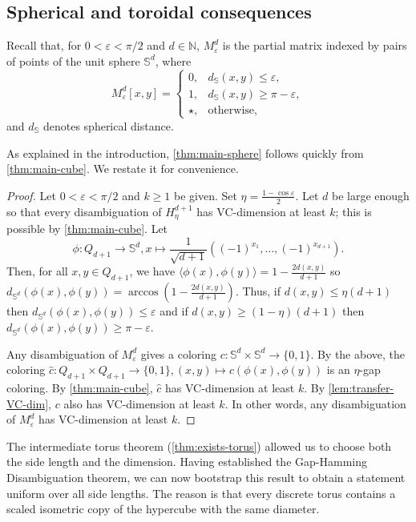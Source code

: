\documentclass[11pt]{article}
\theoremstyle{remark}
\begin{document}
\subsection{Spherical and toroidal consequences}

Recall that, for $0<\varepsilon<\pi/2$ and $d \in \mathbb{N}$, $M_\varepsilon^d$ is the partial matrix indexed by pairs of points of the unit sphere $\mathbb S^d$, where
\[
M_\varepsilon^d[x,y]=
\begin{cases}
0, & d_{\mathbb S}(x,y)\leq\varepsilon,\\
1, & d_{\mathbb S}(x,y)\geq\pi-\varepsilon,\\
\star, & \text{otherwise},
\end{cases}
\]
and $d_{\mathbb S}$ denotes spherical distance.

As explained in the introduction, \cref{thm:main-sphere} follows quickly from \cref{thm:main-cube}. We restate it for convenience.

\mainsphere*

\begin{proof}
    Let $0 < \varepsilon < \pi/2$ and $k \geq 1$ be given.
    Set $\eta = \frac{1-\cos\varepsilon}{2}$.
    Let $d$ be large enough so that every disambiguation of $H_{\eta}^{d+1}$ has VC-dimension at least $k$; this is possible by \cref{thm:main-cube}.
    Let \[\phi : Q_{d+1} \to \mathbb{S}^{d}, x \mapsto \frac{1}{\sqrt{d+1}}\left((-1)^{x_1}, \ldots, (-1)^{x_{d+1}}\right).\]
    Then, for all $x, y \in Q_{d+1}$, we have $\langle \phi(x), \phi(y)\rangle = 1-\frac{2d(x, y)}{d+1}$ so $d_{\mathbb{S}^{d}}(\phi(x), \phi(y)) = \arccos\left(1-\frac{2d(x, y)}{d+1}\right)$.
    Thus, if $d(x, y) \leq \eta (d+1)$ then $d_{\mathbb{S}^{d}}(\phi(x), \phi(y)) \leq \varepsilon$ and if $d(x, y) \geq (1-\eta) (d+1)$ then $d_{\mathbb{S}^{d}}(\phi(x), \phi(y)) \geq \pi - \varepsilon$.
    
    Any disambiguation of $M_{\varepsilon}^d$ gives a coloring $c : \mathbb{S}^{d} \times \mathbb{S}^{d} \to \{0, 1\}$.
    By the above, the coloring $\widehat{c} : Q_{d+1} \times Q_{d+1} \to \{0, 1\}, (x, y) \mapsto c(\phi(x), \phi(y))$ is an $\eta$-gap coloring.
    By \cref{thm:main-cube}, $\widehat{c}$ has VC-dimension at least $k$.
    By \cref{lem:transfer-VC-dim}, $c$ also has VC-dimension at least $k$.
    In other words, any disambiguation of $M_{\varepsilon}^d$ has VC-dimension at least $k$.
\end{proof}
 
The intermediate torus theorem (\cref{thm:exists-torus}) allowed us to choose both the side length and the dimension.
Having established the Gap-Hamming Disambiguation theorem, we can now bootstrap this result to obtain a statement uniform over all side lengths. 
The reason is that every discrete torus contains a scaled isometric copy of the hypercube with the same diameter.
\end{document}
